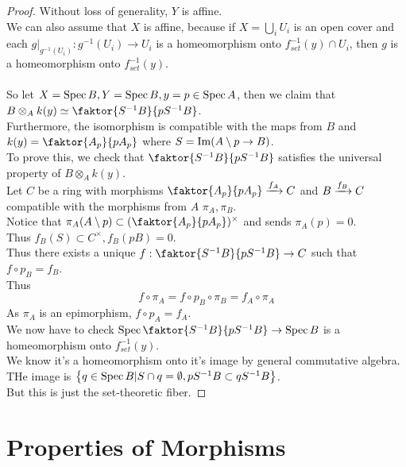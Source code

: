 \documentclass[../main.tex]{subfiles}
\begin{document}
\begin{proof}
Without loss of generality, $Y$ is affine.\\
We can also assume that $X$ is affine, because if $X= \bigcup_i U_i$ is an open cover and each $g|_{g^{-1}( U_i) } : g^{-1}( U_i) \to U_i$ is a homeomorphism onto $f_{set}^{-1}( y) \cap U_i$, then $g$ is a homeomorphism onto $f_{set} ^{-1}( y) $.\\\\
So let $X= \operatorname{Spec} B, Y = \operatorname{Spec} B, y = p \in \operatorname{Spec} A$, then we claim that $B\otimes_A k( y) \simeq \faktor{S^{-1}B}{p S^{-1}B} $.\\
Furthermore, the isomorphism is compatible with the maps from $B$ and $k( y) = \faktor{A_p }{p A_p}$ where $S= \operatorname{Im} ( A\setminus p \to B) $.\\
To prove this, we check that $ \faktor{S^{-1}B}{p S^{-1}B}$ satisfies the universal property of $B \otimes_A k( y) $.\\
Let $C$ be a ring with morphisms $ \faktor{A_p}{p A_p}\xto{f_A} C$ and $B \xrightarrow{f_B} C$ compatible with the morphisms from $A$ $\pi_A,\pi_B$.\\
Notice that $\pi_A( A\setminus p) \subset ( \faktor{A_p}{pA_p})^{\times} $ and sends $\pi_A( p) =0$.\\
Thus $f_B( S) \subset C^{\times}, f_B( pB) =0$.\\
Thus there exists a unique $f: \faktor{S^{-1}B}{p S^{-1}B}\to C$ such that $f\circ p_B = f_B$.\\
Thus
\[ 
f\circ\pi_A = f\circ p_B \circ \pi_B = f_A\circ \pi_A
\]
As $\pi_A$ is an epimorphism, $f\circ p_A = f_A $.\\

We now have to check $\spec \faktor{S^{-1}B}{p S^{-1}B}\to \spec B$ is a homeomorphism onto $f_{set}^{-1}( y) $.\\

We know it's a homeomorphism onto it's image by general commutative algebra.\\
THe image is $ \left\{ q\in \operatorname{Spec} B| S\cap q=\emptyset, pS^{-1}B \subset q S^{-1}B  \right\} $.\\
But this is just the set-theoretic fiber.
\end{proof}
\section{Properties of Morphisms}
\end{document}
